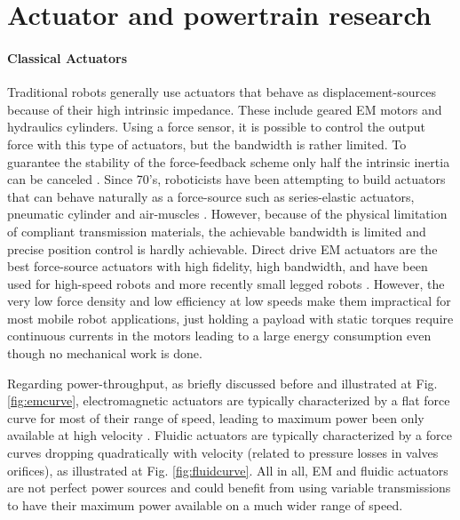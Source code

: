 \section{Actuator and powertrain research}
\label{sec:actres}

\paragraph{Classical Actuators} Traditional robots generally use actuators that behave as displacement-sources because of their high intrinsic impedance. These include geared EM motors and hydraulics cylinders. Using a force sensor, it is possible to control the output force with this type of actuators, but the bandwidth is rather limited. To guarantee the stability of the force-feedback scheme only half the intrinsic inertia can be canceled \cite{hogan_impedance_2004}. Since 70's, roboticists have been attempting to build actuators that can behave naturally as a force-source such as series-elastic actuators, pneumatic cylinder and air-muscles \cite{hanafusa_stable_1977}\cite{pratt_series_1995}. However, because of the physical limitation of compliant transmission materials, the achievable bandwidth is limited and precise position control is hardly achievable. Direct drive EM actuators are the best force-source actuators with high fidelity, high bandwidth, and have been used for high-speed robots \cite{asada_direct-drive_1987} and more recently small legged robots \cite{kenneally_design_2016}. However, the very low force density \cite{hollerbach_comparative_1992} and low efficiency at low speeds make them impractical for most mobile robot applications, just holding a payload with static torques require continuous currents in the motors leading to a large energy consumption even though no mechanical work is done. 

Regarding power-throughput, as briefly discussed before and illustrated at Fig. \ref{fig:emcurve}, electromagnetic actuators are typically characterized by a flat force curve for most of their range of speed, leading to maximum power been only available at high velocity \cite{girard_two-speed_2015}. Fluidic actuators are typically characterized by a force curves dropping quadratically with velocity (related to pressure losses in valves orifices), as illustrated at Fig. \ref{fig:fluidcurve}. All in all, EM and fluidic actuators are not perfect power sources and could benefit from using variable transmissions to have their maximum power available on a much wider range of speed.

